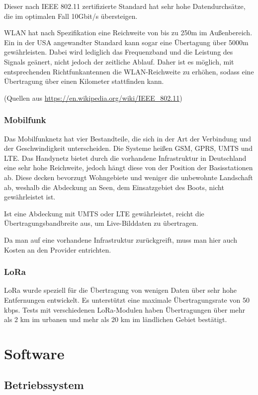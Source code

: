 \documentclass[a4paper]{article}
\begin{document}
Dieser nach IEEE 802.11 zertifizierte Standard hat sehr hohe Datendurchsätze, die im optimalen Fall 10Gbit/s übersteigen.

WLAN hat nach Spezifikation eine Reichweite von bis zu 250m im Außenbereich. Ein in der USA angewandter Standard kann sogar eine 
Übertagung über 5000m gewährleisten. Dabei wird lediglich das Frequenzband und die Leistung des Signals geänert, nicht jedoch der 
zeitliche Ablauf. Daher ist es möglich, mit entsprechenden Richtfunkantennen die WLAN-Reichweite zu erhöhen, sodass eine Übertragung 
über einen Kilometer stattfinden kann.

(Quellen aus \url{https://en.wikipedia.org/wiki/IEEE_802.11})

\subsubsection{Mobilfunk}

Das Mobilfunknetz hat vier Bestandteile, die sich in der Art der Verbindung und der Geschwindigkeit unterscheiden. Die Systeme heißen 
GSM, GPRS, UMTS und LTE. Das Handynetz bietet durch die vorhandene Infrastruktur in Deutschland eine sehr hohe Reichweite, jedoch 
hängt diese von der Position der Basisstationen ab. Diese decken bevorzugt Wohngebiete und weniger die unbewohnte Landschaft ab, 
weshalb die Abdeckung an Seen, dem Einsatzgebiet des Boots, nicht gewährleistet ist.

Ist eine Abdeckung mit UMTS oder LTE gewährleistet, reicht die Übertragungsbandbreite aus, um Live-Bilddaten zu übertragen.

Da man auf eine vorhandene Infrastruktur zurückgreift, muss man hier auch Kosten an den Provider entrichten.

\subsubsection{LoRa}

LoRa wurde speziell für die Übertragung von wenigen Daten über sehr hohe Entfernungen entwickelt. Es unterstützt eine maximale 
Übertragungsrate von 50 kbps. Tests mit verschiedenen LoRa-Modulen haben Übertragungen über mehr als 2 km im urbanen und mehr als 20 
km im ländlichen Gebiet bestätigt.

\section{Software}

\subsection{Betriebssystem}
\end{document}
